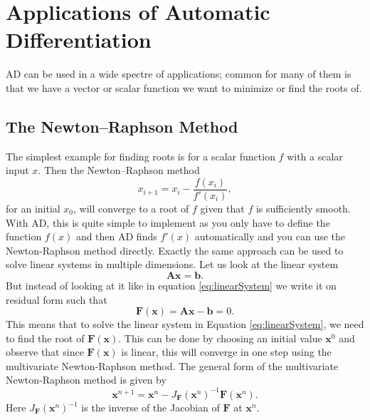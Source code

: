 \section{Applications of Automatic Differentiation}
\label{sec:ApplicationsAD}
AD can be used in a wide spectre of applications; common for many of them is that we have a vector or scalar function we want to minimize or find the roots of.

\subsection{The Newton--Raphson Method}
The simplest example for finding roots is for a scalar function $f$ with a scalar input $x$. Then the Newton--Raphson method
\begin{equation*}
    x_{i+1} = x_i - \frac{f(x_i)}{f'(x_i)},
\end{equation*}
for an initial $x_0$, will converge to a root of $f$ given that $f$ is sufficiently smooth. With AD, this is quite simple to implement as you only have to define the function $f(x)$ and then AD finds $f'(x)$ automatically and you can use the Newton-Raphson method directly. Exactly the same approach can be used to solve linear systems in multiple dimensions. Let us look at the linear system 
\begin{equation}
    \textbf{A}\boldsymbol{x} = \textbf{b}.
    \label{eq:linearSystem}
\end{equation}
But instead of looking at it like in equation \eqref{eq:linearSystem} we write it on residual form such that
\begin{equation*}
	\boldsymbol{F}(\boldsymbol{x}) = \textbf{A}\boldsymbol{x} - \boldsymbol{b} = 0 .
\end{equation*}
This means that to solve the linear system in Equation \eqref{eq:linearSystem}, we need to find the root of $\boldsymbol{F}(\boldsymbol{x})$. This can be done by choosing an initial value $\boldsymbol{x}^0$ and observe that since $\boldsymbol{F}(\boldsymbol{x})$ is linear, this will converge in one step using the multivariate Newton-Raphson method. The general form of the multivariate Newton-Raphson method is given by
\begin{equation}
	\boldsymbol{x}^{n+1} = \boldsymbol{x}^n - J_{\boldsymbol{F}}  (\boldsymbol{x}^n)^{-1} \boldsymbol{F}(\boldsymbol{x}^n).
    \label{eq:newtonRaphsonVector}
\end{equation}
Here $J_{\boldsymbol{F}}  (\boldsymbol{x}^n)^{-1}$ is the inverse of the Jacobian of $\boldsymbol{F}$ at $\boldsymbol{x}^n$. 

